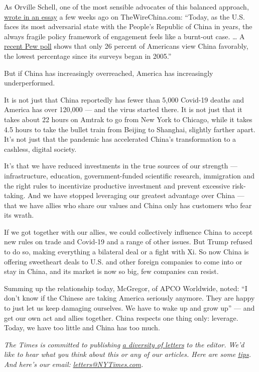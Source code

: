 As Orville Schell, one of the most sensible advocates of this balanced
approach,
\href{https://www.thewirechina.com/2020/06/07/the-birth-life-and-death-of-engagement/}{wrote
in an essay} a few weeks ago on TheWireChina.com: ``Today, as the U.S.
faces its most adversarial state with the People's Republic of China in
years, the always fragile policy framework of engagement feels like a
burnt-out case. \ldots{} A
\href{https://www.pewresearch.org/global/2020/04/21/u-s-views-of-china-increasingly-negative-amid-coronavirus-outbreak/}{recent
Pew poll} shows that only 26 percent of Americans view China favorably,
the lowest percentage since its surveys began in 2005.''

But if China has increasingly overreached, America has increasingly
underperformed.

It is not just that China reportedly has fewer than 5,000 Covid-19
deaths and America has over 120,000 --- and the virus started there. It
is not just that it takes about 22 hours on Amtrak to go from New York
to Chicago, while it takes 4.5 hours to take the bullet train from
Beijing to Shanghai, slightly farther apart. It's not just that the
pandemic has accelerated China's transformation to a cashless, digital
society.

It's that we have reduced investments in the true sources of our
strength --- infrastructure, education, government-funded scientific
research, immigration and the right rules to incentivize productive
investment and prevent excessive risk-taking. And we have stopped
leveraging our greatest advantage over China --- that we have allies who
share our values and China only has customers who fear its wrath.

If we got together with our allies, we could collectively influence
China to accept new rules on trade and Covid-19 and a range of other
issues. But Trump refused to do so, making everything a bilateral deal
or a fight with Xi. So now China is offering sweetheart deals to U.S.
and other foreign companies to come into or stay in China, and its
market is now so big, few companies can resist.

Summing up the relationship today, McGregor, of APCO Worldwide, noted:
``I don't know if the Chinese are taking America seriously anymore. They
are happy to just let us keep damaging ourselves. We have to wake up and
grow up'' --- and get our own act and allies together. China respects
one thing only: leverage. Today, we have too little and China has too
much.

\emph{The Times is committed to publishing}
\href{https://www.nytimes3xbfgragh.onion/2019/01/31/opinion/letters/letters-to-editor-new-york-times-women.html}{\emph{a
diversity of letters}} \emph{to the editor. We'd like to hear what you
think about this or any of our articles. Here are some}
\href{https://help.nytimes3xbfgragh.onion/hc/en-us/articles/115014925288-How-to-submit-a-letter-to-the-editor}{\emph{tips}}\emph{.
And here's our email:}
\href{mailto:letters@NYTimes.com}{\emph{letters@NYTimes.com}}\emph{.}

